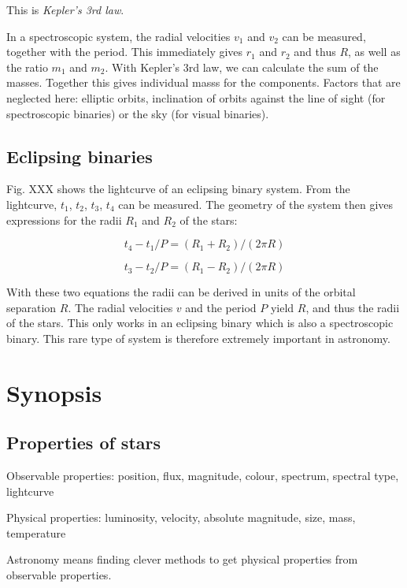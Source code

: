 This is \textit{Kepler's 3rd law}. 

In a spectroscopic system, the radial velocities $v_1$ and $v_2$ can be measured, together with the period. This immediately gives $r_1$ and $r_2$ and thus $R$, as well as the ratio $m_1$ and $m_2$. With Kepler's 3rd law, we can calculate the sum of the masses. Together this gives individual masss for the components. Factors that are neglected here: elliptic orbits, inclination of orbits against the line of sight (for spectroscopic binaries) or the sky (for visual binaries). 

\subsection{Eclipsing binaries}

Fig. XXX shows the lightcurve of an eclipsing binary system. From the lightcurve, $t_1$, $t_2$, $t_3$, $t_4$ can be measured. The geometry of the system then gives expressions for the radii $R_1$ and $R_2$ of the stars:

\begin{equation}
t_4 - t_1 / P = (R_1 + R_2) / (2 \pi R)
\end{equation}

\begin{equation}
t_3 - t_2 / P = (R_1 - R_2) / (2 \pi R)
\end{equation}

With these two equations the radii can be derived in units of the orbital separation $R$. The radial velocities $v$ and the period $P$ yield $R$, and thus the radii of the stars. This only works in an eclipsing binary which is also a spectroscopic binary. This rare type of system is therefore extremely important in astronomy.

\section{Synopsis}

\subsection{Properties of stars}

Observable properties: position, flux, magnitude, colour, spectrum, spectral type, lightcurve

Physical properties: luminosity, velocity, absolute magnitude, size, mass, temperature

Astronomy means finding clever methods to get physical properties from observable properties.

